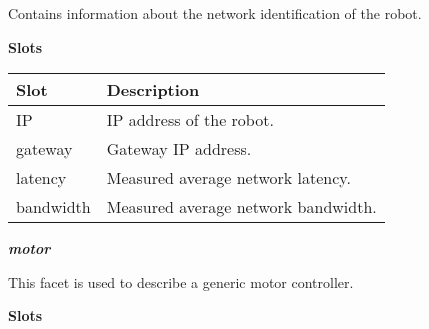 \documentclass[a4paper]{article}
\begin{document}
{\sffamily
Contains information about the network identification of the robot.}

{\sffamily\bfseries
Slots}

\begin{flushleft}
\tablehead{}
\begin{supertabular}{|m{2.8669999cm}|m{12.422cm}|}
\hline
{}\sffamily\bfseries Slot &
\sffamily\bfseries Description\\\hline
{} IP &
\sffamily IP address of the robot.\\\hline
{} gateway &
\sffamily Gateway IP address.\\\hline
{} latency &
\sffamily Measured average network
latency.\\\hline
{} bandwidth &
\sffamily Measured average network
bandwidth.\\\hline
\end{supertabular}
\end{flushleft}
{\sffamily\bfseries\itshape
motor}

{\sffamily
This facet is used to describe a generic motor controller.}

{\sffamily\bfseries
Slots}
\end{document}
